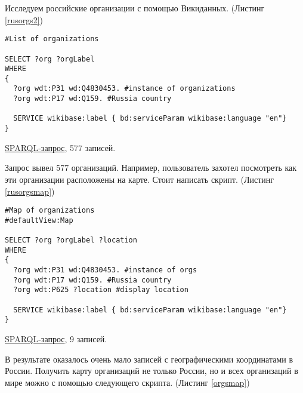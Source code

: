 Исследуем российские организации с помощью Викиданных. (Листинг \ref{rusorgs2})

\begin{lstlisting}[language=SPARQL,label=rusorgs2,caption=Организации России]
#List of organizations 

SELECT ?org ?orgLabel
WHERE
{
  ?org wdt:P31 wd:Q4830453. #instance of organizations
  ?org wdt:P17 wd:Q159. #Russia country

  SERVICE wikibase:label { bd:serviceParam wikibase:language "en"}
}
\end{lstlisting}

\href{https://query.wikidata.org/#%23List%20of%20organisations%20%0A%0ASELECT%20%3Forg%20%3ForgLabel%20%3Flocation%0AWHERE%0A%7B%0A%20%20%3Forg%20wdt%3AP31%20wd%3AQ4830453.%20%23instance%20of%20orgs%0A%20%20%3Forg%20wdt%3AP17%20wd%3AQ159.%20%23Russia%20country%0A%0A%20%20SERVICE%20wikibase%3Alabel%20%7B%20bd%3AserviceParam%20wikibase%3Alanguage%20%22en%22%7D%0A%7D}{SPARQL-запрос}, 577 записей.

Запрос вывел 577 организаций. Например, пользователь захотел посмотреть как эти организации расположены на карте. Стоит написать скрипт. (Листинг \ref{rusorgsmap})

\begin{lstlisting}[language=SPARQL,label=rusorgsmap,caption=Карта организаций России]
#Map of organizations 
#defaultView:Map

SELECT ?org ?orgLabel ?location
WHERE
{
  ?org wdt:P31 wd:Q4830453. #instance of orgs
  ?org wdt:P17 wd:Q159. #Russia country
  ?org wdt:P625 ?location #display location

  SERVICE wikibase:label { bd:serviceParam wikibase:language "en"}
}
\end{lstlisting}

\href{https://query.wikidata.org/#%23List%20of%20organisations%20%0A%23defaultView%3AMap%0A%0ASELECT%20%3Forg%20%3ForgLabel%20%3Flocation%0AWHERE%0A%7B%0A%20%20%3Forg%20wdt%3AP31%20wd%3AQ4830453.%20%23instance%20of%20orgs%0A%20%20%3Forg%20wdt%3AP17%20wd%3AQ159.%20%23Russia%20country%0A%20%20%3Forg%20wdt%3AP625%20%3Flocation%0A%0A%20%20SERVICE%20wikibase%3Alabel%20%7B%20bd%3AserviceParam%20wikibase%3Alanguage%20%22en%22%7D%0A%7D}{SPARQL-запрос}, 9 записей.

В результате оказалось очень мало записей с географическими координатами в России. Получить карту организаций не только России, но и всех организаций в мире можно с помощью следующего скрипта. (Листинг \ref{orgsmap})

